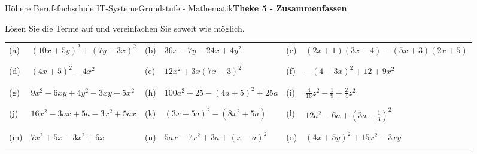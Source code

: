\documentclass[oneside,openany,headings=optiontotoc,11pt,numbers=noenddot]{scrreprt}
\begin{document}
	\begin{worksheet}{Höhere Berufsfachschule IT-Systeme}{Grundstufe - Mathematik}{\textbf{Theke 5 - Zusammenfassen}}
		\begin{framed}
			\noindent
			Lösen Sie die Terme auf und vereinfachen Sie soweit wie möglich.\\
			\begin{tabularx}{\textwidth}{lXlXlX}
				\\
				(a) & \((10x+5y)^2 + (7y-3x)^2\) & (b) & \(36x -7y - 24x +4y^2\) & (c) & \((2x+1)(3x-4) - (5x+3)(2x+5)\)\\
				\\
				\hline
				\\
				(d) & \((4x+5)^2 - 4x^2\) & (e) & \(12x^2 + 3x (7x-3)^2\) & (f) & \(-(4-3x)^2 + 12 + 9x^2\)\\
				\\
				\hline
				\\
				(g) & \(9x^2 - 6xy +4y^2 - 3xy - 5x^2\) & (h) & \(100a^2+ 25 - (4a+5)^2 + 25a \) & (i) & \(\frac{4}{16}z^2 - \frac{1}{9} + \frac{2}{4}z^2\)\\
				\\
				\hline
				\\
				(j) & \(16x^2 - 3ax +5a - 3x^2 +5ax\) & (k) & \((3x+5a)^2 - (8x^2+5a)\) & (l) & \(12a^2 - 6a + (3a-\frac{1}{3})^2\)\\
				\\
				\hline
				\\
				(m) & \(7x^2+5x -3x^2 + 6x\) & (n) & \(5ax - 7x^2 +3a + (x-a)^2\) & (o) & \((4x+5y)^2 + 15x^2 - 3xy\)\\
				\\
				\hline
			\end{tabularx}
		\end{framed}
	\end{worksheet}
\end{document}
